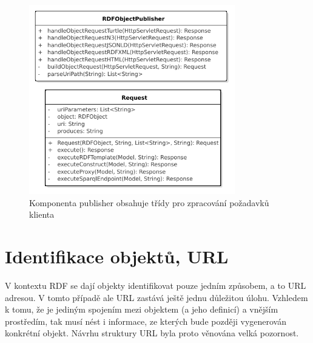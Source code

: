 \documentclass[thesis=B,czech]{FITthesis}[2012/06/26]
\begin{document}
    \begin{figure}\centering
 	\includegraphics[width=0.8\textwidth]{Publisher.pdf}
 	\caption[Model tříd komponenty publisher]{Komponenta publisher obsahuje třídy pro zpracování požadavků klienta}\label{publisher_class}
    \end{figure}
    
    
   \newpage
   
   
 
 \section{Identifikace objektů, URL}
 \label{sec:identifikace}
 V kontextu RDF se dají objekty identifikovat pouze jedním způsobem, a to URL adresou. V tomto případě ale URL zastává ještě jednu důležitou úlohu.
 Vzhledem k tomu, že je jediným spojením mezi objektem (a jeho definicí) a vnějším prostředím, tak musí nést i informace, ze kterých bude později vygenerován
 konkrétní objekt. Návrhu struktury URL byla proto věnována velká pozornost.
 
\end{document}
